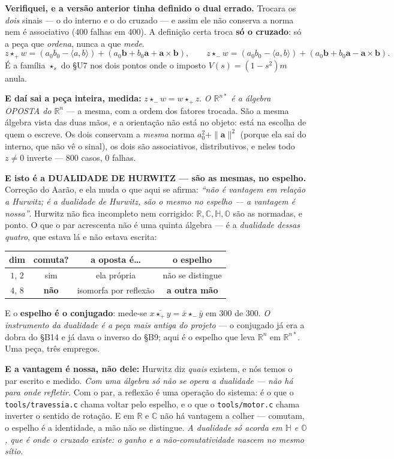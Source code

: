 \documentclass[11pt]{article}
\providecommand{\Oo}{\mathbb O}
\newcommand{\code}[1]{\texttt{\small #1}}
\newcommand{\R}{\mathbb R}
\newcommand{\C}{\mathbb C}
\newcommand{\Hq}{\mathbb H}
\theoremstyle{plain}
\theoremstyle{remark}
\begin{document}
\begin{itemize}
\textbf{Verifiquei, e a versão anterior tinha definido o dual errado.} Trocara os \emph{dois} sinais --- o do
interno e o do cruzado --- e assim ele não conserva a norma nem é associativo ($400$ falhas em
$400$). A definição certa troca \textbf{só o cruzado}: só a peça que \emph{ordena}, nunca a que
\emph{mede}.
\[
 z\star_+w=(a_0b_0-\langle a,b\rangle)+(a_0\mathbf b+b_0\mathbf a+\mathbf a\times\mathbf b),\qquad
 z\star_-w=(a_0b_0-\langle a,b\rangle)+(a_0\mathbf b+b_0\mathbf a-\mathbf a\times\mathbf b).
\]
É a família $\star_s$ do §U7 nos dois pontos onde o imposto $V(s)=(1-s^2)m$ anula.

\textbf{E daí sai a peça inteira, medida:} $z\star_-w=w\star_+z$. \emph{O $\R^{n*}$ é a álgebra
OPOSTA do $\R^n$} --- a mesma, com a ordem dos fatores trocada. São a mesma álgebra vista das duas
mãos, e a orientação não está no objeto: está na escolha de quem o escreve. Os dois conservam a
\emph{mesma} norma $a_0^2+\|\mathbf a\|^2$ (porque ela sai do interno, que não vê o sinal), os
dois são associativos, distributivos, e neles todo $z\ne0$ inverte --- $800$ casos, $0$ falhas.

\textbf{E isto é a DUALIDADE DE HURWITZ --- são as mesmas, no espelho.} Correção do Aarão, e ela
muda o que aqui se afirma: \emph{``não é vantagem em relação a Hurwitz; é a dualidade de Hurwitz,
são o mesmo no espelho --- a vantagem é nossa''}. Hurwitz não fica incompleto nem corrigido:
$\R,\C,\Hq,\Oo$ são as normadas, e ponto. O que o par acrescenta não é uma quinta álgebra --- é a
\emph{dualidade dessas quatro}, que estava lá e não estava escrita:
\begin{center}\small
\begin{tabular}{cccc}
\toprule
dim & comuta? & a oposta é\dots & o espelho \\
\midrule
$1$, $2$ & sim & ela própria & não se distingue \\
$4$, $8$ & \textbf{não} & isomorfa por reflexão & \textbf{a outra mão} \\
\bottomrule
\end{tabular}
\end{center}
E o \textbf{espelho é o conjugado}: mede-se $\overline{x\star_+y}=\bar x\star_-\bar y$ em $300$ de
$300$. \emph{O instrumento da dualidade é a peça mais antiga do projeto} --- o conjugado já era a
dobra do §B14 e já dava o inverso do §B9; aqui é o espelho que leva $\R^n$ em $\R^{n*}$. Uma peça,
três empregos.

\textbf{E a vantagem é nossa, não dele:} Hurwitz diz \emph{quais} existem, e nós temos o par
escrito e medido. \emph{Com uma álgebra só não se opera a dualidade --- não há para onde
refletir.} Com o par, a reflexão é uma operação do sistema: é o que o \code{tools/travessia.c}
chama voltar pelo espelho, e o que o \code{tools/motor.c} chama inverter o sentido de rotação. E
em $\R$ e $\C$ não há vantagem a colher --- comutam, o espelho é a identidade, a mão não se
distingue. \emph{A dualidade só acorda em $\Hq$ e $\Oo$, que é onde o cruzado existe: o ganho e a
não-comutatividade nascem no mesmo sítio.}


\end{itemize}
\end{document}
